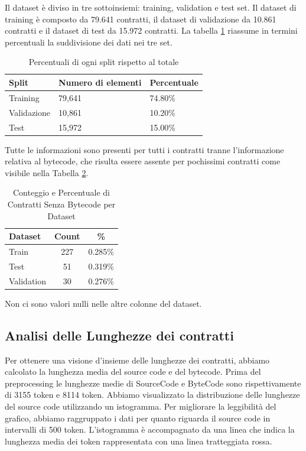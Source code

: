 \documentclass[../../Thesis.tex]{subfiles}
\begin{document}
Il dataset è diviso in tre sottoinsiemi: training, validation e test set.
Il dataset di training è composto da 79.641 contratti, il dataset di validazione da 10.861 contratti e il dataset di test da 15.972 contratti. La tabella \ref{tab:split} riassume in termini percentuali la suddivisione dei dati nei tre set.
\begin{table}[h!]
    \centering
    \begin{tabular}{|l|l|l|}
    \hline
    \textbf{Split} & \textbf{Numero di elementi} & \textbf{Percentuale} \\ \hline
    Training       & 79,641                        & 74.80\%               \\ \hline
    Validazione    & 10,861                        & 10.20\%               \\ \hline
    Test           & 15,972                        & 15.00\%               \\ \hline
    \end{tabular}
    \caption{Percentuali di ogni split rispetto al totale}
    \label{tab:split}
\end{table}
    
Tutte le informazioni sono presenti per tutti i contratti tranne l'informazione relativa al bytecode, che risulta essere assente per pochissimi contratti come visibile nella Tabella \ref{tab:no_bytecode_count}. 
\begin{table}[h!]
    \centering
    \begin{tabular}{|l|c|c|}
        \hline
        \textbf{Dataset} & \textbf{Count} & \textbf{\%} \\
        \hline
        Train & 227 & 0.285\% \\
        Test & 51 & 0.319\% \\
        Validation & 30 & 0.276\% \\
        \hline
    \end{tabular}
    \caption{Conteggio e Percentuale di Contratti Senza Bytecode per Dataset}
    \label{tab:no_bytecode_count}
\end{table}
Non ci sono valori nulli nelle altre colonne del dataset.
\subsection{Analisi delle Lunghezze dei contratti}
Per ottenere una visione d'insieme delle lunghezze dei contratti, abbiamo calcolato la lunghezza media del source code e del bytecode. Prima del preprocessing le lunghezze medie di SourceCode e ByteCode sono rispettivamente di 3155 token e 8114 token.
Abbiamo visualizzato la distribuzione delle lunghezze del source code utilizzando un istogramma. Per migliorare la leggibilità del grafico, abbiamo raggruppato i dati per quanto riguarda il source code in intervalli di 500 token. L'istogramma è accompagnato da una linea che indica la lunghezza media dei token rappresentata con una linea tratteggiata rossa.
\end{document}
